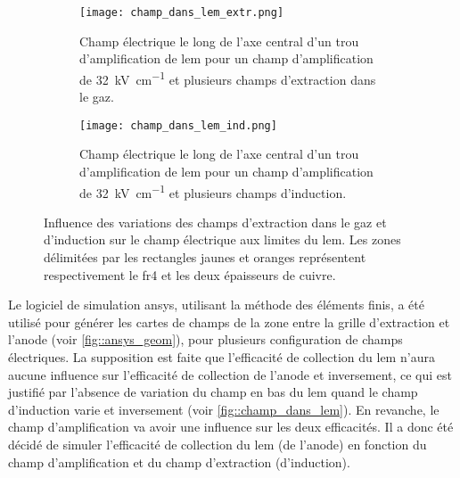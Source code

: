       \begin{figure}[htpb]
        \begin{subfigure}[t]{0.48\textwidth}
          \texttt{[image: champ\_dans\_lem\_extr.png]}
          \caption{\label{fig::champ_dans_lem_extr}Champ électrique le long de l'axe central d'un trou d'amplification de \gls{lem} pour un champ d'amplification de \SI{32}{\kilo\volt\per\centi\meter} et plusieurs champs d'extraction dans le gaz.}
        \end{subfigure}
        \hfill
        \begin{subfigure}[t]{0.48\textwidth}
          \texttt{[image: champ\_dans\_lem\_ind.png]}
          \caption{\label{fig::champ_dans_lem_ind}Champ électrique le long de l'axe central d'un trou d'amplification de \gls{lem} pour un champ d'amplification de \SI{32}{\kilo\volt\per\centi\meter} et plusieurs champs d'induction.}
        \end{subfigure}
        \caption[Influence des variations des champs d'extraction et d'induction sur le champ électrique aux limites du LEM]{\label{fig::champ_dans_lem}Influence des variations des champs d'extraction dans le gaz et d'induction sur le champ électrique aux limites du \gls{lem}. Les zones délimitées par les rectangles jaunes et oranges représentent respectivement le \gls{fr4} et les deux épaisseurs de cuivre.}
      \end{figure}
      
      Le logiciel de simulation \gls{ansys}, utilisant la méthode des éléments finis, a été utilisé pour générer les cartes de champs de la zone entre la grille d'extraction et l'anode (voir \autoref{fig::ansys_geom}), pour plusieurs configuration de champs électriques. La supposition est faite que l'efficacité de collection du \gls{lem} n'aura aucune influence sur l'efficacité de collection de l'anode et inversement, ce qui est justifié par l'absence de variation du champ en bas du \gls{lem} quand le champ d'induction varie et inversement (voir \autoref{fig::champ_dans_lem}). En revanche, le champ d'amplification va avoir une influence sur les deux efficacités. Il a donc été décidé de simuler l'efficacité de collection du \gls{lem} (de l'anode) en fonction du champ d'amplification et du champ d'extraction (d'induction).
            
